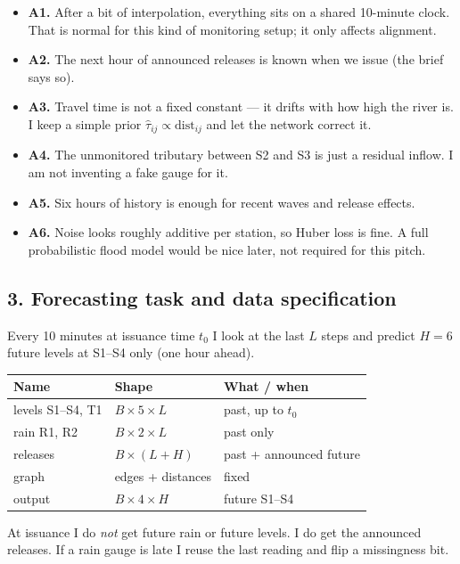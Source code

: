 \documentclass[11pt,a4paper]{article}
\begin{document}
\begin{itemize}[leftmargin=1.2em,itemsep=0.25em]
\item \textbf{A1.} After a bit of interpolation, everything sits on a shared 10-minute clock. That is normal for this kind of monitoring setup; it only affects alignment.
\item \textbf{A2.} The next hour of announced releases is known when we issue (the brief says so).
\item \textbf{A3.} Travel time is not a fixed constant --- it drifts with how high the river is. I keep a simple prior $\hat\tau_{ij}\propto\mathrm{dist}_{ij}$ and let the network correct it.
\item \textbf{A4.} The unmonitored tributary between S2 and S3 is just a residual inflow. I am not inventing a fake gauge for it.
\item \textbf{A5.} Six hours of history is enough for recent waves and release effects.
\item \textbf{A6.} Noise looks roughly additive per station, so Huber loss is fine. A full probabilistic flood model would be nice later, not required for this pitch.
\end{itemize}

\subsection{3. Forecasting task and data specification}

Every 10 minutes at issuance time $t_0$ I look at the last $L$ steps and predict $H=6$ future levels at S1--S4 only (one hour ahead).

\begin{center}
\small
\begin{tabular}{llp{5.4cm}}
\toprule
Name & Shape & What / when \\
\midrule
levels S1--S4, T1 & $B\times 5\times L$ & past, up to $t_0$ \\
rain R1, R2 & $B\times 2\times L$ & past only \\
releases & $B\times (L+H)$ & past + announced future \\
graph & edges + distances & fixed \\
output & $B\times 4\times H$ & future S1--S4 \\
\bottomrule
\end{tabular}
\end{center}

At issuance I do \emph{not} get future rain or future levels. I do get the announced releases. If a rain gauge is late I reuse the last reading and flip a missingness bit.
\end{document}
